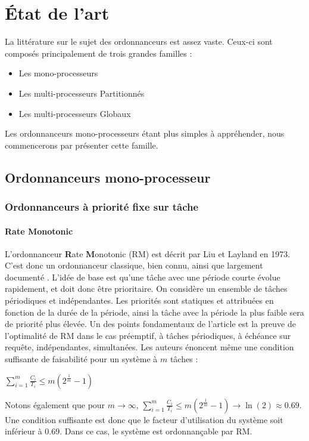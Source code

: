 \documentclass[11pt,a4paper,oneside]{report}
\begin{document}
	
	\chapter{État de l'art}
	
	La littérature sur le sujet des ordonnanceurs est assez vaste. 
	Ceux-ci sont composés principalement de trois grandes familles :\medskip
	\begin{itemize}
		\item Les mono-processeurs
		\item Les multi-processeurs Partitionnés
		\item Les multi-processeurs Globaux
	\end{itemize}
	Les ordonnanceurs mono-processeurs étant plus simples à appréhender, nous commencerons 
	par présenter cette famille.
	
	\section{Ordonnanceurs mono-processeur}
	\subsection{Ordonnanceurs à priorité fixe sur tâche}
	
	\subsubsection{Rate Monotonic}
	L'ordonnanceur \textbf{R}ate \textbf{M}onotonic (RM) est décrit par Liu et Layland \cite{liu_scheduling_1973} en 1973. C'est 
	donc un ordonnanceur classique, bien connu, ainsi que largement documenté \cite{kermia_ordonnancement_2009}. 
	L'idée de base est qu'une tâche avec une période courte évolue rapidement, et 
	doit donc être prioritaire.\medskip
	On considère un ensemble de tâches périodiques et indépendantes.
	Les priorités sont statiques et attribuées en fonction de la durée de la période, ainsi 
	la tâche avec la période la plus faible sera de priorité plus élevée. 
	Un des points fondamentaux de l'article est la preuve de l'optimalité de RM dans le cas 
	préemptif, à tâches périodiques, à échéance sur requête, indépendantes, simultanées.
	Les auteurs énoncent même une condition suffisante de faisabilité pour un système à $m$ tâches : \medskip
	\begin{center}
		$\sum_{i=1}^{m}\frac{C_i}{T_i} \leq m(2^{\frac{1}{m}}-1)$
	\end{center}
	Notons également que pour $m \rightarrow \infty$, $\sum_{i=1}^{m}\frac{C_i}{T_i} \leq m(2^{\frac{1}{m}}-1) \rightarrow \ln(2) \approx 0.69$.
	Une condition suffisante est donc que le facteur d'utilisation du système soit inférieur à 0.69. 
	Dans ce cas, le système est ordonnançable par RM.\medskip
	
\end{document}
